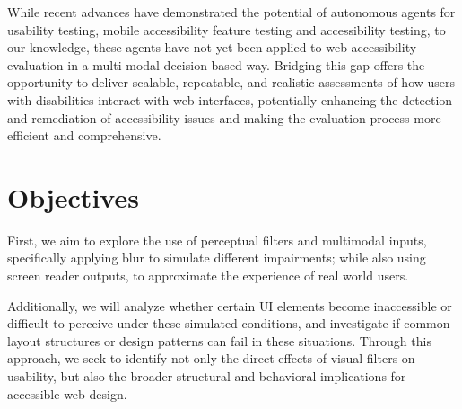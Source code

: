 
While recent advances have demonstrated the potential of autonomous agents for usability testing\cite{lu2025uxagent}, mobile accessibility feature testing\cite{taeb2024axnav} and accessibility testing\cite{zhong2025screenaudit}, to our knowledge, these agents have not yet been applied to web accessibility evaluation in a multi-modal decision-based way. Bridging this gap offers the opportunity to deliver scalable, repeatable, and realistic assessments of how users with disabilities interact with web interfaces, potentially enhancing the detection and remediation of accessibility issues and making the evaluation process more efficient and comprehensive.

\section{Objectives}

First, we aim to explore the use of perceptual filters and multimodal inputs, specifically applying blur to simulate different impairments; while also using screen reader outputs, to approximate the experience of real world users. 

Additionally, we will analyze whether certain \ac{UI} elements become inaccessible or difficult to perceive under these simulated conditions, and investigate if common layout structures or design patterns can fail in these situations. Through this approach, we seek to identify not only the direct effects of visual filters on usability, but also the broader structural and behavioral implications for accessible web design.
